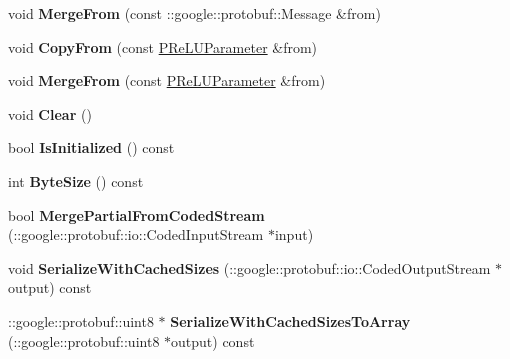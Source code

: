 \begin{DoxyCompactItemize}
\mbox{\label{classcaffe_1_1_p_re_l_u_parameter_aca91a34205670c6eb57e65669986b11b}} 
void {\bfseries Merge\+From} (const \+::google\+::protobuf\+::\+Message \&from)
\item 
\mbox{\label{classcaffe_1_1_p_re_l_u_parameter_a25406c9a358c8c38c1bb314b0f87ef7f}} 
void {\bfseries Copy\+From} (const \mbox{\hyperlink{classcaffe_1_1_p_re_l_u_parameter}{P\+Re\+L\+U\+Parameter}} \&from)
\item 
\mbox{\label{classcaffe_1_1_p_re_l_u_parameter_acf194cc62c7fc23d33230146bc8001ab}} 
void {\bfseries Merge\+From} (const \mbox{\hyperlink{classcaffe_1_1_p_re_l_u_parameter}{P\+Re\+L\+U\+Parameter}} \&from)
\item 
\mbox{\label{classcaffe_1_1_p_re_l_u_parameter_a1149d7ccf4c50625fdff41bc81bbba11}} 
void {\bfseries Clear} ()
\item 
\mbox{\label{classcaffe_1_1_p_re_l_u_parameter_a298a81f435533ee3dc9289d7053be5e0}} 
bool {\bfseries Is\+Initialized} () const
\item 
\mbox{\label{classcaffe_1_1_p_re_l_u_parameter_af9e4cfa819dc1515f8d68ed58bac6f59}} 
int {\bfseries Byte\+Size} () const
\item 
\mbox{\label{classcaffe_1_1_p_re_l_u_parameter_a66e87a72164698224c01e4053d5b2056}} 
bool {\bfseries Merge\+Partial\+From\+Coded\+Stream} (\+::google\+::protobuf\+::io\+::\+Coded\+Input\+Stream $\ast$input)
\item 
\mbox{\label{classcaffe_1_1_p_re_l_u_parameter_a9cc97d0c33344a2c720f955748d337bb}} 
void {\bfseries Serialize\+With\+Cached\+Sizes} (\+::google\+::protobuf\+::io\+::\+Coded\+Output\+Stream $\ast$output) const
\item 
\mbox{\label{classcaffe_1_1_p_re_l_u_parameter_a06596b8368e5e75347a93b9f3aaa5689}} 
\+::google\+::protobuf\+::uint8 $\ast$ {\bfseries Serialize\+With\+Cached\+Sizes\+To\+Array} (\+::google\+::protobuf\+::uint8 $\ast$output) const

\end{DoxyCompactItemize}
